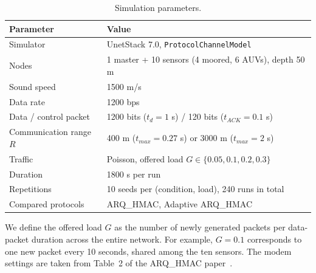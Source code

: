 \documentclass{article}
\begin{document}
\begin{table}[H]
\centering
\caption{Simulation parameters.}
\label{tab:params}
\small
{}
\begin{tabular}{@{}ll@{}}
\toprule
\textbf{Parameter} & \textbf{Value} \\
\midrule
Simulator & UnetStack 7.0, \texttt{ProtocolChannelModel} \\
Nodes & 1 master + 10 sensors (4 moored, 6 AUVs), depth 50 m \\
Sound speed & 1500 m/s \\
Data rate & 1200 bps \\
Data / control packet & 1200 bits ($t_d = 1$ s) / 120 bits ($t_{ACK} = 0.1$ s) \\
Communication range $R$ & 400 m ($t_{max} = 0.27$ s) or 3000 m ($t_{max} = 2$ s) \\
Traffic & Poisson, offered load $G \in \{0.05, 0.1, 0.2, 0.3\}$ \\
Duration & 1800 s per run \\
Repetitions & 10 seeds per (condition, load), 240 runs in total \\
Compared protocols & ARQ\_HMAC, Adaptive ARQ\_HMAC \\
\bottomrule
\end{tabular}
\end{table}

We define the offered load $G$ as the number of newly generated packets per data-packet duration across the entire network. For example, $G = 0.1$ corresponds to one new packet every 10 seconds, shared among the ten sensors. The modem settings are taken from Table~2 of the ARQ\_HMAC paper~\cite{dao2025}.
\end{document}
